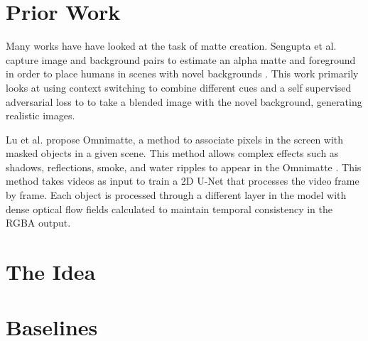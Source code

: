 \documentclass{amsart}
\begin{document}
\section{Prior Work}
Many works have have looked at the task of matte creation. Sengupta et al. capture image and background pairs to estimate an alpha matte and foreground in order to place humans in scenes with novel backgrounds \cite{BMSengupta20}. This work primarily looks at using context switching to combine different cues and a self supervised adversarial loss to to take a blended image with the novel background, generating realistic images.

Lu et al. propose Omnimatte, a method to associate pixels in the screen with masked objects in a given scene. This method allows complex effects such as shadows, reflections, smoke, and water ripples to appear in the Omnimatte \cite{lu2021}. This method takes videos as input to train a 2D U-Net that processes the video frame by frame. Each object is processed through a different layer in the model with dense optical flow fields calculated to maintain temporal consistency in the RGBA output.



\section{The Idea}


\section{Baselines}

\printbibliography
\end{document}
